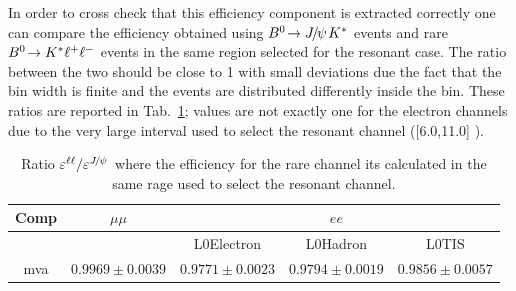 In order to cross check that this efficiency component is extracted correctly
one can compare the efficiency obtained using $\decay{\Bz}{\jpsi\Kstar}$ events
and rare ${{B}^0}\!\rightarrow {\ensuremath{{K}^*}} \ell^+\ell^-$ events in the same \qsq region selected
for the resonant case. The ratio between the two should be close to 1 with
small deviations due the fact that the bin width is finite and the events are distributed
differently inside the bin. These ratios are reported in Tab.~\ref{tab:mva_in_jpsibin};
values are not exactly one for the electron channels due to the very large \qsq interval
used to select the resonant channel ([6.0,11.0] \gevgevcccc).

\begin{table}[h!]
\centering
\caption{Ratio $\varepsilon^{\ell\ell} / \varepsilon^{\jpsi}$ where the efficiency for the
rare channel its calculated in the same \qsq rage used to select the resonant channel.}
\begin{tabular}{|c|c|c|c|c|}
\hline Comp 			&  $\mu\mu$  				& \multicolumn {3}{c|}{$ee$}  \\ \hline
				&   &  L0Electron 	& L0Hadron 	& L0TIS \\ \hline
mva  & $ 0.9969  \pm  0.0039 $ & $ 0.9771  \pm  0.0023 $ & $ 0.9794  \pm  0.0019 $ & $ 0.9856  \pm  0.0057 $ \\ 
\hline
\end{tabular}
\label{tab:mva_in_jpsibin}
\end{table}

\clearpage








